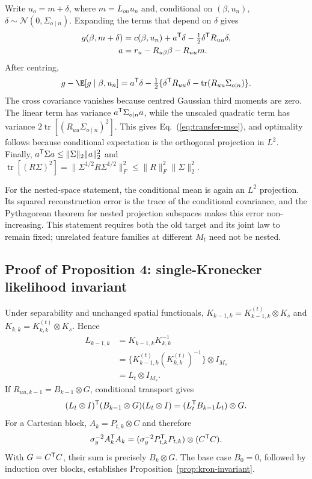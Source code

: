 Write $u_o=m+\delta$, where $m=L_{on}u_n$ and, conditional on $(\beta,u_n)$, $\delta\sim\mathcal N(0,\Sigma_{o\mid n})$. Expanding the terms that depend on $\delta$ gives
\begin{align*}
 g(\beta,m+\delta)&=c(\beta,u_n)+a^{\mathsf T}\delta
 -\tfrac12\delta^{\mathsf T}R_{uu}\delta,\\
 a&=r_u-R_{u\beta}\beta-R_{uu}m.
\end{align*}
After centring,
\[
 g-\E[g\mid\beta,u_n]
 =a^{\trans}\delta-\tfrac12\{\delta^{\trans}R_{uu}\delta-
 \operatorname{tr}(R_{uu}\Sigma_{o\mid n})\}.
\]
The cross covariance vanishes because centred Gaussian third moments are zero. The linear term has variance $a^{\mathsf T}\Sigma_{o\mid n}a$, while the unscaled quadratic term has variance $2\operatorname{tr}[(R_{uu}\Sigma_{o\mid n})^2]$. This gives Eq.~(\ref{eq:transfer-mse}), and optimality follows because conditional expectation is the orthogonal projection in $L^2$. Finally,
$a^{\mathsf T}\Sigma a\leq\|\Sigma\|_2\|a\|_2^2$ and
$\operatorname{tr}[(R\Sigma)^2]=\|\Sigma^{1/2}R\Sigma^{1/2}\|_F^2\leq\|R\|_F^2\|\Sigma\|_2^2$.

For the nested-space statement, the conditional mean is again an $L^2$ projection. Its squared reconstruction error is the trace of the conditional covariance, and the Pythagorean theorem for nested projection subspaces makes this error non-increasing. This statement requires both the old target and its joint law to remain fixed; unrelated feature families at different $M_t$ need not be nested.

\subsection{Proof of Proposition 4: single-Kronecker likelihood invariant}
\label{app:kron-invariant}

Under separability and unchanged spatial functionals,
$K_{k-1,k}=K_{k-1,k}^{(t)}\otimes K_s$ and
$K_{k,k}=K_{k,k}^{(t)}\otimes K_s$. Hence
\begin{align*}
L_{k-1,k}&=K_{k-1,k}K_{k,k}^{-1}\\
&=\{K_{k-1,k}^{(t)}(K_{k,k}^{(t)})^{-1}\}\otimes I_{M_s}\\
&=L_t\otimes I_{M_s}.
\end{align*}
If $R_{uu,k-1}=B_{k-1}\otimes G$, conditional transport gives
\[
(L_t\otimes I)^{\mathsf T}(B_{k-1}\otimes G)(L_t\otimes I)
=(L_t^{\mathsf T}B_{k-1}L_t)\otimes G.
\]
For a Cartesian block, $A_k=P_{t,k}\otimes C$ and therefore
\[
\sigma_y^{-2}A_k^{\mathsf T}A_k
=(\sigma_y^{-2}P_{t,k}^{\mathsf T}P_{t,k})\otimes(C^{\mathsf T}C).
\]
With $G=C^{\mathsf T}C$, their sum is precisely $B_k\otimes G$. The base case
$B_0=0$, followed by induction over blocks, establishes Proposition~\ref{prop:kron-invariant}.

